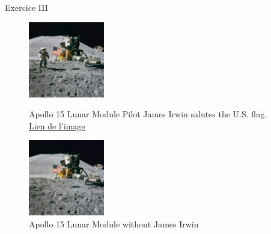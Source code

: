 	\begin{frame}{Exercice III}

		\begin{figure}[H]
			\centering
			\begin{minipage}{.5\textwidth}
				\centering
				\includegraphics[height=125px]{Images/purge/Apollo_15_flag,_rover,_LM,_Irwin}
				\caption{\tiny{Apollo 15 Lunar Module Pilot James Irwin salutes the U.S. flag.\\\href{http://louvainlinux.github.io/atelier-gimp/src/Images/purge/Apollo_15_flag,_rover,_LM,_Irwin.jpg}{Lien de l'image}}}
			\end{minipage}%
			\begin{minipage}{.5\textwidth}
				\centering
				\includegraphics[height=125px]{Images/purge/Apollo_15_flag,_rover,_LM}
				\caption{\tiny{Apollo 15 Lunar Module without James Irwin}}
			\end{minipage}
		\end{figure}
	\end{frame}
